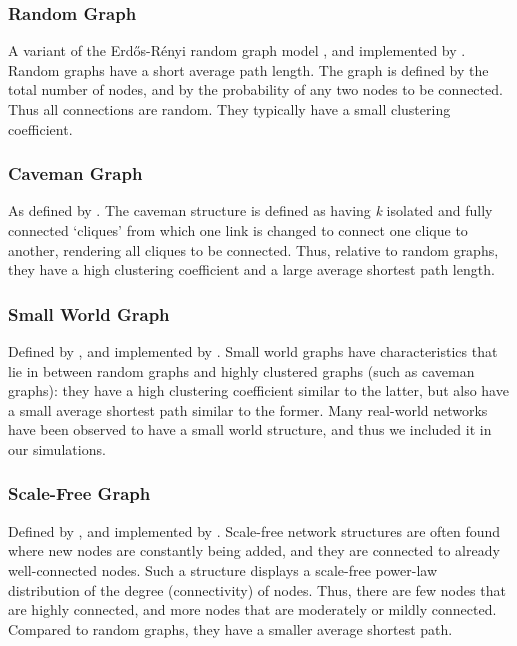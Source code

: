 \subsubsection{Random Graph}

A variant of the Erd\H{o}s-R\'enyi random graph model \citep*{ER1960}, and implemented by \citet*{BS2011}.
Random graphs have a short average path length. The graph is defined by the total number of nodes, and by the probability of any two nodes to be connected. Thus all connections are random. They typically have a small clustering coefficient.

\subsubsection{Caveman Graph}

As defined by \citet*{W2003}.
The caveman structure is defined as having \emph{k} isolated and fully connected `cliques' from which one link is changed to connect one clique to another, rendering all cliques to be connected. Thus, relative to random graphs, they have a high clustering coefficient and a large average shortest path length.

\subsubsection{Small World Graph}

Defined by \citet*{WS1998}, and implemented by \citet*{BS2011}.
Small world graphs have characteristics that lie in between random graphs and highly clustered graphs (such as caveman graphs): they have a high clustering coefficient similar to the latter, but also have a small average shortest path similar to the former. Many real-world networks have been observed to have a small world structure, and thus we included it in our simulations.

\subsubsection{Scale-Free Graph}

Defined by \citet*{BA1999}, and implemented by \citet*{BS2011}.
Scale-free network structures are often found where new nodes are constantly being added, and they are connected to already well-connected nodes. Such a structure displays a scale-free power-law distribution of the degree (connectivity) of nodes. Thus, there are few nodes that are highly connected, and more nodes that are moderately or mildly connected. Compared to random graphs, they have a smaller average shortest path.

